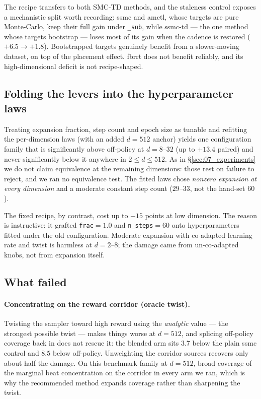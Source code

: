 The recipe transfers to both SMC-TD methods, and the staleness control exposes
a mechanistic split worth recording: ssmc and amctl, whose targets are pure
Monte-Carlo, keep their full gain under \texttt{\_sub}, while ssmc-td --- the
one method whose targets bootstrap --- loses most of its gain when the cadence
is restored ($+6.5\to+1.8$). Bootstrapped targets genuinely benefit from a
slower-moving dataset, on top of the placement effect. fbrrt does not benefit
reliably, and its high-dimensional deficit is not recipe-shaped.

\subsection{Folding the levers into the hyperparameter laws}

Treating expansion fraction, step count and epoch size as tunable and refitting
the per-dimension laws (with an added $d=512$ anchor) yields one configuration
family that is significantly above off-policy at $d=8$--$32$ (up to $+13.4$
paired) and never significantly below it anywhere in $2\le d\le512$. As in
\S\ref{sec:07_experiments} we do not claim equivalence at the remaining
dimensions: those rest on failure to reject, and we ran no equivalence test. The fitted laws chose \emph{nonzero
expansion at every dimension} and a moderate constant step count ($29$--$33$,
not the hand-set $60$).

The fixed recipe, by contrast, cost up to $-15$ points at low dimension. The
reason is instructive: it grafted \texttt{frac}$=1.0$ and \texttt{n\_steps}$=60$
onto hyperparameters fitted under the old configuration. Moderate expansion
with co-adapted learning rate and twist is harmless at $d=2$--$8$; the damage
came from un-co-adapted knobs, not from expansion itself.

\subsection{What failed}
\label{subsec:b-failures}

\paragraph{Concentrating on the reward corridor (oracle twist).}
Twisting the sampler toward high reward using the \emph{analytic} value ---
the strongest possible twist --- makes things worse at $d=512$, and splicing
off-policy coverage back in does not rescue it: the blended arm sits $3.7$
below the plain ssmc control and $8.5$ below off-policy. Unweighting the
corridor sources recovers only about half the damage. On this benchmark family at $d=512$, broad coverage of the marginal beat
concentration on the corridor in every arm we ran, which is why the
recommended method expands coverage rather than sharpening the twist.

